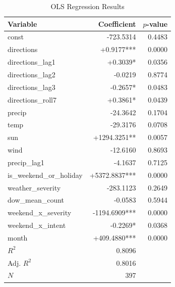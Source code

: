 \begin{table}[htbp]
\centering
\caption{OLS Regression Results}
\label{tab:ols}
\begin{tabular}{lrr}
\toprule
Variable & Coefficient & $p$-value \\
\midrule
  const & -723.5314 & 0.4483 \\
  directions & +0.9177*** & 0.0000 \\
  directions\_lag1 & +0.3039* & 0.0356 \\
  directions\_lag2 & -0.0219 & 0.8774 \\
  directions\_lag3 & -0.2657* & 0.0483 \\
  directions\_roll7 & +0.3861* & 0.0439 \\
  precip & -24.3642 & 0.1704 \\
  temp & -29.3176 & 0.0708 \\
  sun & +1294.3251** & 0.0057 \\
  wind & -12.6160 & 0.8693 \\
  precip\_lag1 & -4.1637 & 0.7125 \\
  is\_weekend\_or\_holiday & +5372.8837*** & 0.0000 \\
  weather\_severity & -283.1123 & 0.2649 \\
  dow\_mean\_count & -0.0583 & 0.5944 \\
  weekend\_x\_severity & -1194.6909*** & 0.0000 \\
  weekend\_x\_intent & -0.2269* & 0.0368 \\
  month & +409.4880*** & 0.0000 \\
\midrule
  $R^2$ & 0.8096 & \\
  Adj. $R^2$ & 0.8016 & \\
  $N$ & 397 & \\
\bottomrule
\end{tabular}
\end{table}